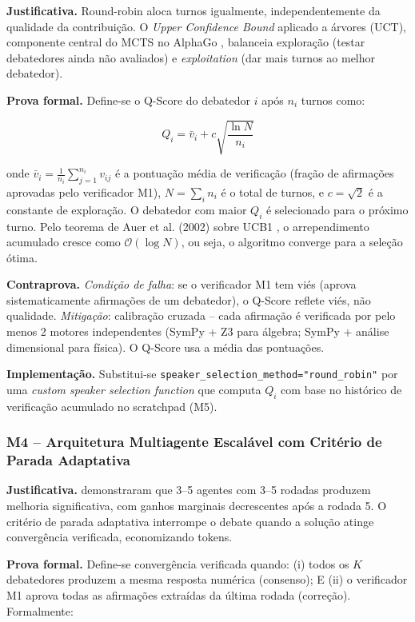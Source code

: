 \documentclass[5p]{elsarticle}
\theoremstyle{remark}
\begin{document}
\textbf{Justificativa.} Round-robin aloca turnos igualmente, independentemente da qualidade da contribuição. O \textit{Upper Confidence Bound} aplicado a árvores (UCT), componente central do MCTS no AlphaGo \cite{Silver2016AlphaGo}, balanceia exploração (testar debatedores ainda não avaliados) e \textit{exploitation} (dar mais turnos ao melhor debatedor).

\textbf{Prova formal.} Define-se o Q-Score do debatedor $i$ após $n_i$ turnos como:

\begin{equation}
Q_i = \bar{v}_i + c \sqrt{\frac{\ln N}{n_i}}
\label{eq:m3_qscore}
\end{equation}

onde $\bar{v}_i = \frac{1}{n_i}\sum_{j=1}^{n_i} v_{ij}$ é a pontuação média de verificação (fração de afirmações aprovadas pelo verificador M1), $N = \sum_i n_i$ é o total de turnos, e $c = \sqrt{2}$ é a constante de exploração. O debatedor com maior $Q_i$ é selecionado para o próximo turno. Pelo teorema de Auer et al. (2002) sobre UCB1 \cite{Auer2002UCB}, o arrependimento acumulado cresce como $\mathcal{O}(\log N)$, ou seja, o algoritmo converge para a seleção ótima.

\textbf{Contraprova.} \textit{Condição de falha}: se o verificador M1 tem viés (aprova sistematicamente afirmações de um debatedor), o Q-Score reflete viés, não qualidade. \textit{Mitigação}: calibração cruzada -- cada afirmação é verificada por pelo menos 2 motores independentes (SymPy + Z3 para álgebra; SymPy + análise dimensional para física). O Q-Score usa a média das pontuações.

\textbf{Implementação.} Substitui-se \texttt{speaker\_selection\_method="round\_robin"} por uma \textit{custom speaker selection function} que computa $Q_i$ com base no histórico de verificação acumulado no scratchpad (M5).

\subsubsection{M4 -- Arquitetura Multiagente Escalável com Critério de Parada Adaptativa}

\textbf{Justificativa.} \cite{Du2023ImprovingFactuality} demonstraram que 3--5 agentes com 3--5 rodadas produzem melhoria significativa, com ganhos marginais decrescentes após a rodada 5. O critério de parada adaptativa interrompe o debate quando a solução atinge convergência verificada, economizando tokens.

\textbf{Prova formal.} Define-se convergência verificada quando: (i) todos os $K$ debatedores produzem a mesma resposta numérica (consenso); E (ii) o verificador M1 aprova todas as afirmações extraídas da última rodada (correção). Formalmente:
\end{document}
